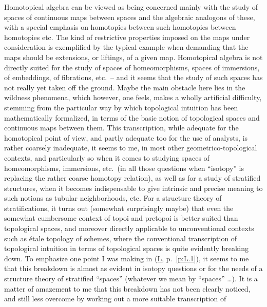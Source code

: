 \setcounter{section}{13}
%
\label{sec:14}%
Homotopical algebra can be viewed as being concerned mainly with the
study of spaces of continuous maps between spaces and the algebraic
analogons of these, with a special emphasis on homotopies between such
homotopies between homotopies etc. The kind of restrictive properties
imposed on the maps under consideration is exemplified by the typical
example when demanding that the maps should be extensions, or
liftings, of a given map. Homotopical algebra is not directly suited
for the study of spaces of homeomorphisms, spaces of immersions, of
embeddings, of fibrations, etc.\ -- and it seems that the study of
such spaces has not really yet taken off the ground. Maybe the main
obstacle here lies in the wildness phenomena, which however, one
feels, makes a wholly artificial difficulty, stemming from the
particular way by which topological intuition has been mathematically
formalized, in terms of the basic notion of topological spaces and
continuous maps between them. This transcription, while adequate for
the homotopical point of view, and partly adequate too for the use of
analysts, is rather coarsely inadequate, it seems to me, in most other
geometrico-topological contexts, and particularly so when it comes to
studying spaces of homeomorphisms, immersions, etc.\ (in all those
questions when ``isotopy'' is replacing the rather coarse homotopy
relation), as well as for a study of stratified structures, when it
becomes indispensable to give intrinsic and precise meaning to such
notions as tubular neighborhoods, etc.  For a structure theory of
stratifications, it turns out (somewhat surprisingly maybe) that even
the somewhat cumbersome context of topoi and pretopoi is better suited
than topological spaces, and moreover directly applicable to
unconventional contexts such as \'etale topology of schemes, where the
conventional transcription of topological intuition in terms of
topological spaces is quite evidently breaking down. To emphasize one
point I was making in (\hyperref[ch:I]{L}, p.~\ref{p:L.1}), it
seems to me that this breakdown is almost as evident in isotopy
questions or for the needs of a structure theory of stratified
``spaces'' (whatever we mean by ``spaces'' \ldots). It is a matter of
amazement to me that this breakdown has not been clearly noticed, and
still less overcome by working out a more suitable transcription of
